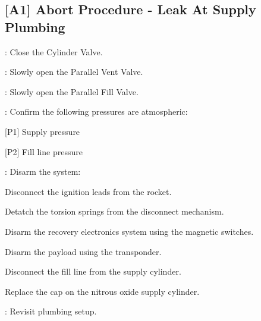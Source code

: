 \begin{checklist}
\subsection{[A1] Abort Procedure - Leak At Supply Plumbing}
\begin{checklist}
    \item \primary{}: Close the Cylinder Valve.
    \item \primary{}: Slowly open the Parallel Vent Valve.
    \item \primary{}: Slowly open the Parallel Fill Valve.
    \item \control{}: Confirm the following pressures are atmospheric:
    \begin{checklist}
        \item {[P1]} Supply pressure
        \item {[P2]} Fill line pressure
    \end{checklist}
    \item \primary{}: Disarm the system:
        \begin{checklist}    
            \item Disconnect the ignition leads from the rocket.
            \item Detatch the torsion springs from the disconnect mechanism.
            \item Disarm the recovery electronics system using the magnetic switches.
            \item Disarm the payload using the transponder.
            \item Disconnect the fill line from the supply cylinder.
            \item Replace the cap on the nitrous oxide supply cylinder.
        \end{checklist}
    \item \ops{}: Revisit plumbing setup.
\end{checklist}
\setcounter{checklistnum}{0}


\end{checklist}
